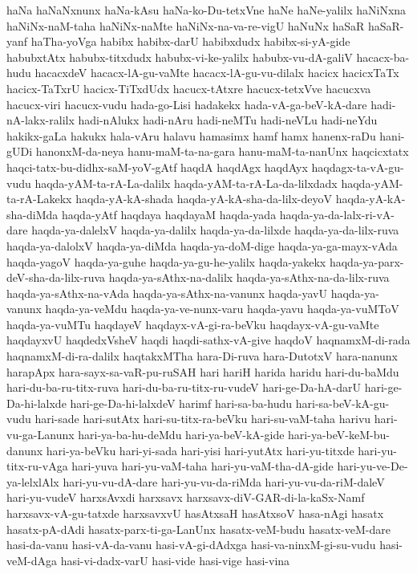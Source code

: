 {haNa
haNaNxnunx
haNa-kAsu
haNa-ko-Du-tetxVne
haNe
haNe-yalilx
haNiNxna
haNiNx-naM-taha
haNiNx-naMte
haNiNx-na-va-re-vigU
haNuNx
haSaR
haSaR-yanf
haTha-yoVga
habibx
habibx-darU
habibxdudx
habibx-si-yA-gide
habubxtAtx
habubx-titxdudx
habubx-vi-ke-yalilx
habubx-vu-dA-galiV
hacacx-ba-hudu
hacacxdeV
hacacx-lA-gu-vaMte
hacacx-lA-gu-vu-dilalx
hacicx
hacicxTaTx
hacicx-TaTxrU
hacicx-TiTxdUdx
hacucx-tAtxre
hacucx-tetxVve
hacucxva
hacucx-viri
hacucx-vudu
hada-go-Lisi
hadakekx
hada-vA-ga-beV-kA-dare
hadi-nA-lakx-ralilx
hadi-nAlukx
hadi-nAru
hadi-neMTu
hadi-neVLu
hadi-neYdu
hakikx-gaLa
hakukx
hala-vAru
halavu
hamasimx
hamf
hamx
hanenx-raDu
hani-gUDi
hanonxM-da-neya
hanu-maM-ta-na-gara
hanu-maM-ta-nanUnx
haqcicxtatx
haqci-tatx-bu-didhx-saM-yoV-gAtf
haqdA
haqdAgx
haqdAyx
haqdagx-ta-vA-gu-vudu
haqda-yAM-ta-rA-La-dalilx
haqda-yAM-ta-rA-La-da-lilxdadx
haqda-yAM-ta-rA-Lakekx
haqda-yA-kA-shada
haqda-yA-kA-sha-da-lilx-deyoV
haqda-yA-kA-sha-diMda
haqda-yAtf
haqdaya
haqdayaM
haqda-yada
haqda-ya-da-lalx-ri-vA-dare
haqda-ya-dalelxV
haqda-ya-dalilx
haqda-ya-da-lilxde
haqda-ya-da-lilx-ruva
haqda-ya-dalolxV
haqda-ya-diMda
haqda-ya-doM-dige
haqda-ya-ga-mayx-vAda
haqda-yagoV
haqda-ya-guhe
haqda-ya-gu-he-yalilx
haqda-yakekx
haqda-ya-parx-deV-sha-da-lilx-ruva
haqda-ya-sAthx-na-dalilx
haqda-ya-sAthx-na-da-lilx-ruva
haqda-ya-sAthx-na-vAda
haqda-ya-sAthx-na-vanunx
haqda-yavU
haqda-ya-vanunx
haqda-ya-veMdu
haqda-ya-ve-nunx-varu
haqda-yavu
haqda-ya-vuMToV
haqda-ya-vuMTu
haqdayeV
haqdayx-vA-gi-ra-beVku
haqdayx-vA-gu-vaMte
haqdayxvU
haqdedxVsheV
haqdi
haqdi-sathx-vA-give
haqdoV
haqnamxM-di-rada
haqnamxM-di-ra-dalilx
haqtakxMTha
hara-Di-ruva
hara-DutotxV
hara-nanunx
harapApx
hara-sayx-sa-vaR-pu-ruSAH
hari
hariH
harida
haridu
hari-du-baMdu
hari-du-ba-ru-titx-ruva
hari-du-ba-ru-titx-ru-vudeV
hari-ge-Da-hA-darU
hari-ge-Da-hi-lalxde
hari-ge-Da-hi-lalxdeV
harimf
hari-sa-ba-hudu
hari-sa-beV-kA-gu-vudu
hari-sade
hari-sutAtx
hari-su-titx-ra-beVku
hari-su-vaM-taha
harivu
hari-vu-ga-Lanunx
hari-ya-ba-hu-deMdu
hari-ya-beV-kA-gide
hari-ya-beV-keM-bu-danunx
hari-ya-beVku
hari-yi-sada
hari-yisi
hari-yutAtx
hari-yu-titxde
hari-yu-titx-ru-vAga
hari-yuva
hari-yu-vaM-taha
hari-yu-vaM-tha-dA-gide
hari-yu-ve-De-ya-lelxlAlx
hari-yu-vu-dA-dare
hari-yu-vu-da-riMda
hari-yu-vu-da-riM-daleV
hari-yu-vudeV
harxsAvxdi
harxsavx
harxsavx-diV-GAR-di-la-kaSx-Namf
harxsavx-vA-gu-tatxde
harxsavxvU
hasAtxsaH
hasAtxsoV
hasa-nAgi
hasatx
hasatx-pA-dAdi
hasatx-parx-ti-ga-LanUnx
hasatx-veM-budu
hasatx-veM-dare
hasi-da-vanu
hasi-vA-da-vanu
hasi-vA-gi-dAdxga
hasi-va-ninxM-gi-su-vudu
hasi-veM-dAga
hasi-vi-dadx-varU
hasi-vide
hasi-vige
hasi-vina
}
